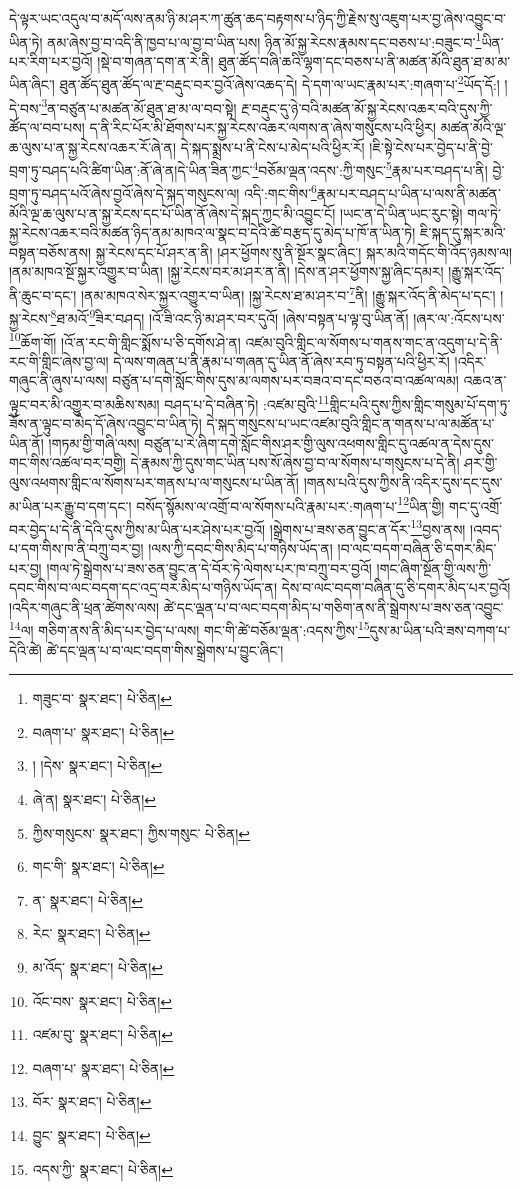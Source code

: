 དེ་ལྟར་ཡང་འདུལ་བ་མདོ་ལས་ནམ་ཉི་མ་ཤར་ཀ་ཚུན་ཆད་བརྟགས་པ་ཉིད་ཀྱི་རྗེས་སུ་འཇུག་པར་བྱ་ཞེས་འབྱུང་བ་ཡིན་ཏེ། ནམ་ཞེས་བྱ་བ་འདི་ནི་ཁྱབ་པ་ལ་བྱ་བ་ཡིན་པས། ཉིན་མོ་སྐྱ་རེངས་རྣམས་དང་བཅས་པ་:བཟུང་བ་\footnote{གཟུང་བ་  སྣར་ཐང་།  པེ་ཅིན། }ཡིན་པར་རིག་པར་བྱའོ། །སྡེ་བ་གཞན་དག་ན་རེ་ནི། ཐུན་ཚོད་བཞི་ཆའི་ལྷག་དང་བཅས་པ་ནི་མཚན་མོའི་ཐུན་ཐ་མ་མ་ཡིན་ཞིང་། ཐུན་ཚོད་ཐུན་ཚོད་ལ་རྔ་བརྡུང་བར་བྱའོ་ཞེས་འཆད་དེ། དེ་དག་ལ་ཡང་རྣམ་པར་:གཞག་པ་\footnote{བཞག་པ་  སྣར་ཐང་།  པེ་ཅིན། }ཡོད་དོ:། །དེ་བས་\footnote{། །དེས་  སྣར་ཐང་།  པེ་ཅིན། }ན་བཙུན་པ་མཚན་མོ་ཐུན་ཐ་མ་ལ་བབ་སྟེ། རྔ་བརྡུང་དུ་ཉེ་བའི་མཚན་མོ་སྐྱ་རེངས་འཆར་བའི་དུས་ཀྱི་ཚོད་ལ་བབ་པས། ད་ནི་རིང་པོར་མི་ཐོགས་པར་སྐྱ་རེངས་འཆར་ལགས་ན་ཞེས་གསུངས་པའི་ཕྱིར། མཚན་མོའི་ལྔ་ཆ་ལུས་པ་ན་སྐྱ་རེངས་འཆར་རོ་ཞེ་ན། དེ་སྐད་སྨྲས་པ་ནི་ངེས་པ་མེད་པའི་ཕྱིར་རོ། །ཇི་སྟེ་ངེས་པར་བྱེད་པ་ནི་བྱེ་བྲག་ཏུ་བཤད་པའི་ཚིག་ཡིན་:ནོ་ཞེ་ན།དེ་ཡིན་ཟིན་ཀྱང་\footnote{ཞེ་ན།  སྣར་ཐང་།  པེ་ཅིན། }བཅོམ་ལྡན་འདས་:ཀྱི་གསུང་\footnote{ཀྱིས་གསུངས་  སྣར་ཐང་། ཀྱིས་གསུང་  པེ་ཅིན། }རྣམ་པར་བཤད་པ་ནི། བྱེ་བྲག་ཏུ་བཤད་པའོ་ཞེས་བྱའོ་ཞེས་དེ་སྐད་གསུངས་ལ། འདི་:གང་གིས་\footnote{གང་གི་  སྣར་ཐང་།  པེ་ཅིན། }རྣམ་པར་བཤད་པ་ཡིན་པ་ལས་ནི་མཚན་མོའི་ལྔ་ཆ་ལུས་པ་ན་སྐྱ་རེངས་དང་པོ་ཡིན་ནོ་ཞེས་དེ་སྐད་ཀྱང་མི་འབྱུང་ངོ། །ཡང་ན་དེ་ཡིན་ཡང་རུང་སྟེ། གལ་ཏེ་སྐྱ་རེངས་འཆར་བའི་མཚན་ཉིད་ནམ་མཁའ་ལ་སྣང་བ་དེའི་ཚེ་བརྩད་དུ་མེད་པ་ཁོ་ན་ཡིན་ཏེ། ཇི་སྐད་དུ་སྐར་མའི་བསྟན་བཅོས་ནས། སྐྱ་རེངས་དང་པོ་ཤར་ན་ནི། །ཤར་ཕྱོགས་སུ་ནི་སྔོར་སྣང་ཞིང་། སྐར་མའི་གདོང་གི་འོད་ཉམས་ལ། །ནམ་མཁའ་སྔོ་སྐྱར་འགྱུར་བ་ཡིན། །སྐྱ་རེངས་བར་མ་ཤར་ན་ནི། །དེས་ན་ཤར་ཕྱོགས་སྐྱ་ཞིང་དམར། །རྒྱུ་སྐར་འོད་ནི་ཆུང་བ་དང་། །ནམ་མཁའ་སེར་སྐྱར་འགྱུར་བ་ཡིན། །སྐྱ་རེངས་ཐ་མ་ཤར་བ་\footnote{ན་  སྣར་ཐང་།  པེ་ཅིན། }ནི། །རྒྱུ་སྐར་འོད་ནི་མེད་པ་དང་། །སྐྱ་རེངས་\footnote{རེང་  སྣར་ཐང་།  པེ་ཅིན། }ཐ་མའོ་\footnote{མ་འོད་  སྣར་ཐང་།  པེ་ཅིན། }ཟིར་བཤད། །འོ་ཟི་འང་ཉི་མ་ཤར་བར་དུའོ། །ཞེས་བསྟན་པ་ལྟ་བུ་ཡིན་ནོ། །ཞར་ལ་:འོངས་པས་\footnote{འོང་བས་  སྣར་ཐང་།  པེ་ཅིན། }ཆོག་གོ། །འོ་ན་རང་གི་གླིང་སྨོས་པ་ཅི་དགོས་ཤེ་ན། འཛམ་བུའི་གླིང་ལ་སོགས་པ་གནས་གང་ན་འདུག་པ་དེ་ནི་རང་གི་གླིང་ཞེས་བྱ་ལ། དེ་ལས་གཞན་པ་ནི་རྣམ་པ་གཞན་དུ་ཡིན་ནོ་ཞེས་རབ་ཏུ་བསྟན་པའི་ཕྱིར་རོ། །འདིར་གཞུང་ནི་ཞུས་པ་ལས། བཙུན་པ་དགེ་སློང་གིས་དུས་མ་ལགས་པར་བཟའ་བ་དང་བཅའ་བ་འཚལ་ལམ། འཆའ་ན་ལྟུང་བར་མི་འགྱུར་བ་མཆིས་སམ། བཤད་པ་དེ་བཞིན་ཏེ། :འཛམ་བུའི་\footnote{འཛམ་བུ་  སྣར་ཐང་།  པེ་ཅིན། }གླིང་པའི་དུས་ཀྱིས་གླིང་གསུམ་པོ་དག་ཏུ་ཟོས་ན་ལྟུང་བ་མེད་དོ་ཞེས་འབྱུང་བ་ཡིན་ཏེ། དེ་སྐད་གསུངས་པ་ཡང་འཛམ་བུའི་གླིང་ན་གནས་པ་ལ་མཚོན་པ་ཡིན་ནོ། །གཏམ་གྱི་གཞི་ལས། བཙུན་པ་རེ་ཞིག་དགེ་སློང་གིས་ཤར་གྱི་ལུས་འཕགས་གླིང་དུ་འཚལ་ན་དེས་དུས་གང་གིས་འཚལ་བར་བགྱི། དེ་རྣམས་ཀྱི་དུས་གང་ཡིན་པས་སོ་ཞེས་བྱ་བ་ལ་སོགས་པ་གསུངས་པ་དེ་ནི། ཤར་གྱི་ལུས་འཕགས་གླིང་ལ་སོགས་པར་གནས་པ་ལ་གསུངས་པ་ཡིན་ནོ། །གནས་པའི་དུས་ཀྱིས་ནི་འདིར་དུས་དང་དུས་མ་ཡིན་པར་རྒྱུ་བ་དག་དང་། བསོད་སྙོམས་ལ་འགྲོ་བ་ལ་སོགས་པའི་རྣམ་པར་:གཞག་པ་\footnote{བཞག་པ་  སྣར་ཐང་།  པེ་ཅིན། }ཡིན་གྱི། གང་དུ་འགྲོ་བར་བྱེད་པ་དེ་ནི་དེའི་དུས་ཀྱིས་མ་ཡིན་པར་ཤེས་པར་བྱའོ། །སྒྲེགས་པ་ཟས་ཅན་བྱུང་ན་དོར་\footnote{བོར་  སྣར་ཐང་།  པེ་ཅིན། }བྱས་ནས། །འབད་པ་དག་གིས་ཁ་ནི་བཀྲུ་བར་བྱ། །ལས་ཀྱི་དབང་གིས་མིད་པ་གཉིས་ཡོད་ན། །བ་ལང་བདག་བཞིན་ཅི་དགར་མིད་པར་བྱ། །གལ་ཏེ་སྒྲེགས་པ་ཟས་ཅན་བྱུང་ན་དེ་བོར་ཏེ་ལེགས་པར་ཁ་བཀྲུ་བར་བྱའོ། །གང་ཞིག་སྔོན་གྱི་ལས་ཀྱི་དབང་གིས་བ་ལང་བདག་དང་འདྲ་བར་མིད་པ་གཉིས་ཡོད་ན། དེས་བ་ལང་བདག་བཞིན་དུ་ཅི་དགར་མིད་པར་བྱའོ། །འདིར་གཞུང་ནི་ཕྲན་ཚེགས་ལས། ཚེ་དང་ལྡན་པ་བ་ལང་བདག་མིད་པ་གཅིག་ནས་ནི་སྒྲེགས་པ་ཟས་ཅན་འབྱུང་\footnote{བྱུང་  སྣར་ཐང་།  པེ་ཅིན། }ལ། གཅིག་ནས་ནི་མིད་པར་བྱེད་པ་ལས། གང་གི་ཚེ་བཅོམ་ལྡན་:འདས་ཀྱིས་\footnote{འདས་ཀྱི་  སྣར་ཐང་།  པེ་ཅིན། }དུས་མ་ཡིན་པའི་ཟས་བཀག་པ་དེའི་ཚེ། ཚེ་དང་ལྡན་པ་བ་ལང་བདག་གིས་སྒྲེགས་པ་བྱུང་ཞིང་། 